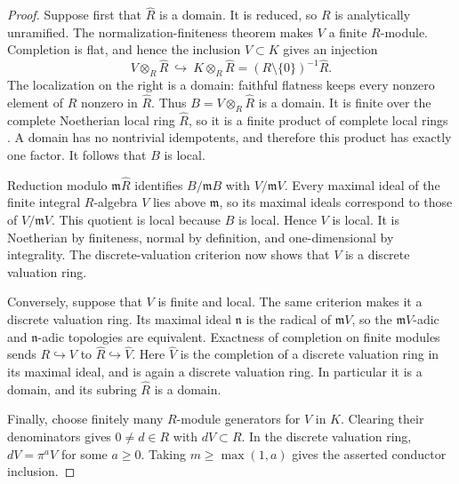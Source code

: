 \begin{proof}
Suppose first that $\widehat R$ is a domain.  It is reduced, so $R$
is analytically unramified.  The normalization-finiteness theorem
\cite[Lemma 10.162.10(4), tag 032Y]{StacksCompletionAnalytic} makes $V$
a finite $R$-module.  Completion is flat, and hence the inclusion
$V\subset K$ gives an injection
\[
 V\otimes_R\widehat R\ \hookrightarrow\
 K\otimes_R\widehat R
 =(R\setminus\{0\})^{-1}\widehat R.
\]
The localization on the right is a domain: faithful flatness keeps
every nonzero element of $R$ nonzero in $\widehat R$.  Thus
$B=V\otimes_R\widehat R$ is a domain.  It is finite over the complete
Noetherian local ring $\widehat R$, so it is a finite product of
complete local rings \cite[Lemma 10.160.2, tag 0325]{StacksCompletionAnalytic}.
A domain has no nontrivial idempotents, and therefore this product
has exactly one factor.  It follows that $B$ is local.

Reduction modulo $\mathfrak m\widehat R$ identifies
$B/\mathfrak mB$ with $V/\mathfrak mV$.  Every maximal ideal of the
finite integral $R$-algebra $V$ lies above $\mathfrak m$, so its
maximal ideals correspond to those of $V/\mathfrak mV$.  This quotient
is local because $B$ is local.  Hence $V$ is local.  It is Noetherian
by finiteness, normal by definition, and one-dimensional by integrality.
The discrete-valuation criterion
\cite[Lemma 10.119.7, tag 00PD]{StacksNormalDomains} now shows that $V$
is a discrete valuation ring.

Conversely, suppose that $V$ is finite and local.  The same criterion
makes it a discrete valuation ring.  Its maximal ideal $\mathfrak n$
is the radical of $\mathfrak mV$, so the $\mathfrak mV$-adic and
$\mathfrak n$-adic topologies are equivalent.  Exactness of completion
on finite modules sends $R\hookrightarrow V$ to
$\widehat R\hookrightarrow\widehat V$.  Here $\widehat V$ is the
completion of a discrete valuation ring in its maximal ideal, and is
again a discrete valuation ring.  In particular it is a domain, and
its subring $\widehat R$ is a domain.

Finally, choose finitely many $R$-module generators for $V$ in $K$.
Clearing their denominators gives $0\ne d\in R$ with $dV\subset R$.
In the discrete valuation ring, $dV=\pi^aV$ for some $a\geq0$.
Taking $m\geq\max(1,a)$ gives the asserted conductor inclusion.
\end{proof}

